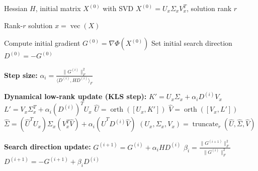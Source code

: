 \begin{algorithm}
\caption{DLRA-CG scheme}
\label{alg:DLRA-CG}
\begin{algorithmic}[1]

\Require Hessian $H$, initial matrix $X^{(0)}$ with SVD $X^{(0)} = U_x \Sigma_x V_x^T$, solution rank $r$

\Ensure Rank-$r$ solution $x = \operatorname{vec}(X)$

\State Compute initial gradient $G^{(0)} = \nabla \Phi(X^{(0)})$
\State Set initial search direction $D^{(0)} = -G^{(0)}$


    \State \textbf{Step size:}
    \State $\displaystyle \alpha_i = \frac{\|G^{(i)}\|_F^2}{\langle D^{(i)}, H D^{(i)} \rangle_F}$

    \State \textbf{Dynamical low-rank update (KLS step):}
    \State $K' = U_x \Sigma_x + \alpha_i D^{(i)} V_x$
    \State $L' = V_x \Sigma_x^T + \alpha_i (D^{(i)})^T U_x$
    \State $\hat U = \operatorname{orth}([U_x, K'])$
    \State $\hat V = \operatorname{orth}([V_x, L'])$
    \State $\hat \Sigma = (\hat U^T U_x)\Sigma_x(V_x^T \hat V) + \alpha_i (\hat U^T D^{(i)} \hat V)$
    \State $(U_x, \Sigma_x, V_x) = \operatorname{truncate}_r(\hat U, \hat \Sigma, \hat V)$

    \State \textbf{Search direction update:}
    \State $G^{(i+1)} = G^{(i)} + \alpha_i H D^{(i)}$ 
    \State $\displaystyle \beta_i =
    \frac{\| G^{(i+1)} \|^2_F}
         {\| G^{(i)} \|^2_F}$
    \State $D^{(i+1)} = -G^{(i+1)} + \beta_i D^{(i)}$

\EndFor

\end{algorithmic}
\end{algorithm}